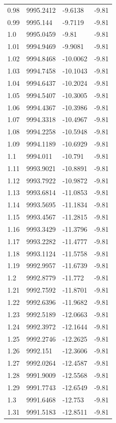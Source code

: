 \begin{table}[H]
\begin{tabular}{llll}
0.98 & 9995.2412 & -9.6138 & -9.81 \\
0.99 & 9995.144 & -9.7119 & -9.81 \\
1.0 & 9995.0459 & -9.81 & -9.81 \\
1.01 & 9994.9469 & -9.9081 & -9.81 \\
1.02 & 9994.8468 & -10.0062 & -9.81 \\
1.03 & 9994.7458 & -10.1043 & -9.81 \\
1.04 & 9994.6437 & -10.2024 & -9.81 \\
1.05 & 9994.5407 & -10.3005 & -9.81 \\
1.06 & 9994.4367 & -10.3986 & -9.81 \\
1.07 & 9994.3318 & -10.4967 & -9.81 \\
1.08 & 9994.2258 & -10.5948 & -9.81 \\
1.09 & 9994.1189 & -10.6929 & -9.81 \\
1.1 & 9994.011 & -10.791 & -9.81 \\
1.11 & 9993.9021 & -10.8891 & -9.81 \\
1.12 & 9993.7922 & -10.9872 & -9.81 \\
1.13 & 9993.6814 & -11.0853 & -9.81 \\
1.14 & 9993.5695 & -11.1834 & -9.81 \\
1.15 & 9993.4567 & -11.2815 & -9.81 \\
1.16 & 9993.3429 & -11.3796 & -9.81 \\
1.17 & 9993.2282 & -11.4777 & -9.81 \\
1.18 & 9993.1124 & -11.5758 & -9.81 \\
1.19 & 9992.9957 & -11.6739 & -9.81 \\
1.2 & 9992.8779 & -11.772 & -9.81 \\
1.21 & 9992.7592 & -11.8701 & -9.81 \\
1.22 & 9992.6396 & -11.9682 & -9.81 \\
1.23 & 9992.5189 & -12.0663 & -9.81 \\
1.24 & 9992.3972 & -12.1644 & -9.81 \\
1.25 & 9992.2746 & -12.2625 & -9.81 \\
1.26 & 9992.151 & -12.3606 & -9.81 \\
1.27 & 9992.0264 & -12.4587 & -9.81 \\
1.28 & 9991.9009 & -12.5568 & -9.81 \\
1.29 & 9991.7743 & -12.6549 & -9.81 \\
1.3 & 9991.6468 & -12.753 & -9.81 \\
1.31 & 9991.5183 & -12.8511 & -9.81 \\

\end{tabular}
\end{table}
